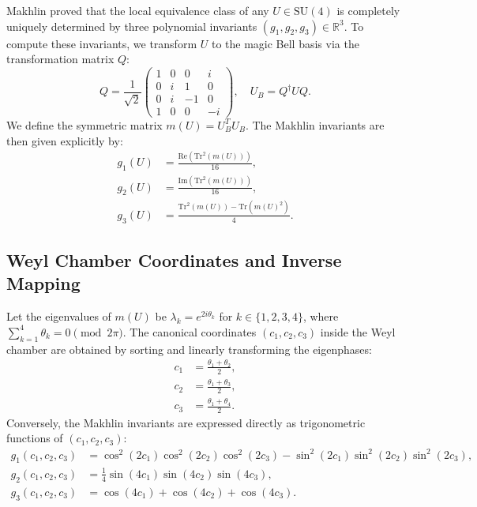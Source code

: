 Makhlin proved that the local equivalence class of any $U \in \text{SU}(4)$ is completely uniquely determined by three polynomial invariants $(g_1, g_2, g_3) \in \mathbb{R}^3$. To compute these invariants, we transform $U$ to the magic Bell basis via the transformation matrix $Q$:
\begin{equation}
    Q = \frac{1}{\sqrt{2}}\begin{pmatrix} 1 & 0 & 0 & i \\ 0 & i & 1 & 0 \\ 0 & i & -1 & 0 \\ 1 & 0 & 0 & -i \end{pmatrix}, \quad U_B = Q^\dagger U Q.
\end{equation}
We define the symmetric matrix $m(U) = U_B^T U_B$. The Makhlin invariants are then given explicitly by:
\begin{align}
    g_1(U) &= \frac{\text{Re}\left(\text{Tr}^2(m(U))\right)}{16}, \\
    g_2(U) &= \frac{\text{Im}\left(\text{Tr}^2(m(U))\right)}{16}, \\
    g_3(U) &= \frac{\text{Tr}^2(m(U)) - \text{Tr}(m(U)^2)}{4}.
\end{align}

\subsection{Weyl Chamber Coordinates and Inverse Mapping}
Let the eigenvalues of $m(U)$ be $\lambda_k = e^{2i \theta_k}$ for $k \in \{1, 2, 3, 4\}$, where $\sum_{k=1}^4 \theta_k = 0 \pmod{2\pi}$. The canonical coordinates $(c_1, c_2, c_3)$ inside the Weyl chamber are obtained by sorting and linearly transforming the eigenphases:
\begin{align}
    c_1 &= \frac{\theta_1 + \theta_2}{2}, \\
    c_2 &= \frac{\theta_1 + \theta_3}{2}, \\
    c_3 &= \frac{\theta_1 + \theta_4}{2}.
\end{align}
Conversely, the Makhlin invariants are expressed directly as trigonometric functions of $(c_1, c_2, c_3)$:
\begin{align}
    g_1(c_1, c_2, c_3) &= \cos^2(2c_1)\cos^2(2c_2)\cos^2(2c_3) - \sin^2(2c_1)\sin^2(2c_2)\sin^2(2c_3), \\
    g_2(c_1, c_2, c_3) &= \frac{1}{4}\sin(4c_1)\sin(4c_2)\sin(4c_3), \\
    g_3(c_1, c_2, c_3) &= \cos(4c_1) + \cos(4c_2) + \cos(4c_3).
\end{align}

